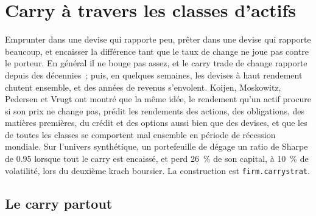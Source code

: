 \chapter{Carry à travers les classes d'actifs}\label{ch:s1:carry-across-asset-classes}

Emprunter dans une devise qui rapporte peu, prêter dans une devise qui rapporte beaucoup, et encaisser la différence tant que le taux de change ne
joue pas contre le porteur. En général il ne bouge pas assez, et le carry trade de change rapporte depuis des décennies~; puis, en quelques semaines, les devises à haut rendement chutent
ensemble, et des années de revenus s'envolent. Koijen, Moskowitz, Pedersen et Vrugt ont montré que la même idée, le rendement qu'un actif procure si son prix ne change pas,
prédit les rendements des actions, des obligations, des matières premières, du crédit et des options aussi bien que des devises, et que les  de toutes les classes se comportent mal ensemble
en période de récession mondiale. Sur l'univers synthétique, un portefeuille de  dégage un ratio de Sharpe de 0.95 lorsque tout le carry est encaissé, et perd 26~\% de son
capital, à 10~\% de volatilité, lors du deuxième krach boursier. La construction est \texttt{firm.carrystrat}.

\section{Le carry partout}

